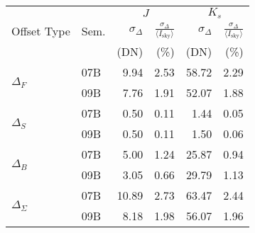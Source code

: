 \begin{tabular}{ll|rr|rr}
&  & \multicolumn{2}{c|}{$J$} & \multicolumn{2}{c}{$K_s$} \\ %
Offset Type & Sem. & $\sigma_\Delta$ & $\frac{\sigma_\Delta}{\langle I_\mathrm{sky}\rangle }$ & $\sigma_\Delta$ & $\frac{\sigma_\Delta}{\langle I_\mathrm{sky}\rangle }$ \\
& & \tiny{(DN)} &  \tiny{(\%)} & \tiny{(DN)} &  \tiny{(\%)} \\
\hline
\multirow{2}{*}{$\Delta_F$} & 07B & 9.94 & 2.53 & 58.72 & 2.29 \\
& 09B  & 7.76 & 1.91 & 52.07 & 1.88 \\
\hline
\multirow{2}{*}{$\Delta_S$} & 07B & 0.50 & 0.11 & 1.44 & 0.05 \\
& 09B & 0.50 & 0.11 & 1.50 & 0.06 \\
\hline
\multirow{2}{*}{$\Delta_B$} & 07B & 5.00 & 1.24 & 25.87 & 0.94 \\
& 09B &  3.05 & 0.66 & 29.79 & 1.13 \\
\hline
\multirow{2}{*}{$\Delta_\Sigma$} & 07B &  10.89 & 2.73 & 63.47 & 2.44 \\
& 09B &  8.18 & 1.98 & 56.07 & 1.96 \\
\end{tabular}